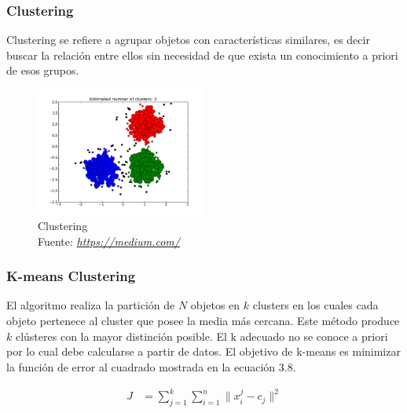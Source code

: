 \subsubsection*{Clustering}
Clustering se refiere a agrupar objetos con características similares, es decir buscar la relación entre ellos sin necesidad de que exista un conocimiento a priori de esos grupos.
\begin{figure}[H]
	\centering
	\includegraphics[width=0.5\textwidth]{Figures/clustering.png}
	\caption{Clustering \\ Fuente:  \href{https://medium.com/deep-math-machine-learning-ai/different-types-of-machine-learning-and-their-types-34760b9128a2}{\textit{https://medium.com/}}}
	\label{Clustering}
\end{figure} 
\subsubsection*{K-means Clustering}
El algoritmo realiza la partición de  $N$ objetos en $k$ clusters en los cuales cada objeto pertenece al cluster que posee la media más cercana. Este método produce $k$ clústeres con la mayor distinción posible. El k adecuado no se conoce a priori por lo cual debe calcularse a partir de datos. El objetivo de k-means es minimizar la función de error al cuadrado mostrada en la ecuación 3.8.

\begin{equation}
  \label{eq:clustering}
  \begin{aligned}
  J&= \sum_{j=1}^{k} \sum_{i=1}^{n}\parallel x_{i}^j - c_{j}\parallel ^2
  \end{aligned}
\end{equation}

